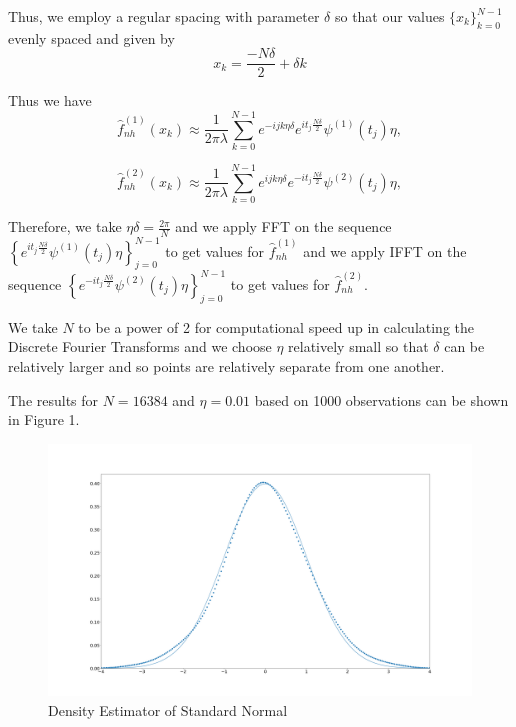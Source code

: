 \documentclass[a4paper,11pt]{article}
\theoremstyle{theorem}
\theoremstyle{definition}
\begin{document}
Thus, we employ a regular spacing with parameter $\delta$ so that our values $\{x_{k}\}_{k=0}^{N-1}$ evenly spaced and given by
\[
x_{k} = \frac{-N\delta}{2} + \delta k
\]

Thus we have
\begin{equation}
\hat{f}_{nh}^{(1)}(x_{k}) \approx \frac{1}{2\pi\lambda}\sum_{k=0}^{N-1}{e^{-ijk\eta\delta}e^{it_{j}\frac{N\delta}{2}}\psi^{(1)}(t_{j})\eta},
\end{equation}

\begin{equation}
\hat{f}_{nh}^{(2)}(x_{k}) \approx \frac{1}{2\pi\lambda}\sum_{k=0}^{N-1}{e^{ijk\eta\delta}e^{-it_{j}\frac{N\delta}{2}}\psi^{(2)}(t_{j})\eta},
\end{equation}

Therefore, we take $\eta\delta = \frac{2\pi}{N}$ and we apply FFT on the sequence $\left\lbrace e^{it_{j}\frac{N\delta}{2}}\psi^{(1)}(t_{j})\eta \right\rbrace_{j=0}^{N-1}$ to get values for $\hat{f}_{nh}^{(1)}$ and we apply IFFT on the sequence $\left\lbrace e^{-it_{j}\frac{N\delta}{2}}\psi^{(2)}(t_{j})\eta \right\rbrace_{j=0}^{N-1}$ to get values for $\hat{f}_{nh}^{(2)}$.

We take $N$ to be a power of 2 for computational speed up in calculating the Discrete Fourier Transforms and we choose $\eta$ relatively small so that $\delta$ can be relatively larger and so points are relatively separate from one another.

The results for $N = 16384$ and $\eta = 0.01$ based on 1000 observations can be shown in Figure 1.

\begin{figure}[h]
\centering
\includegraphics[scale=0.15]{fft_standard_normal.png}
\caption{Density Estimator of Standard Normal}
\label{stdNormal}
\end{figure} 
\end{document}
